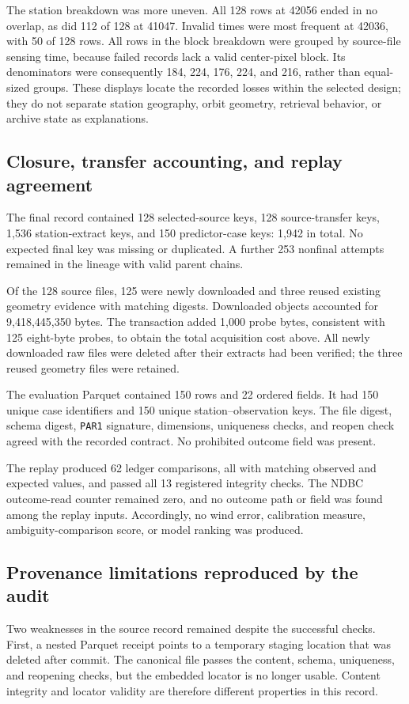 The station breakdown was more uneven. All 128 rows at 42056 ended in no overlap, as did 112 of 128 at 41047. Invalid times were most frequent at 42036, with 50 of 128 rows. All rows in the block breakdown were grouped by source-file sensing time, because failed records lack a valid center-pixel block. Its denominators were consequently 184, 224, 176, 224, and 216, rather than equal-sized groups. These displays locate the recorded losses within the selected design; they do not separate station geography, orbit geometry, retrieval behavior, or archive state as explanations.




\subsection{Closure, transfer accounting, and replay agreement}
The final record contained 128 selected-source keys, 128 source-transfer keys, 1,536 station-extract keys, and 150 predictor-case keys: 1,942 in total. No expected final key was missing or duplicated. A further 253 nonfinal attempts remained in the lineage with valid parent chains.

Of the 128 source files, 125 were newly downloaded and three reused existing geometry evidence with matching digests. Downloaded objects accounted for 9,418,445,350 bytes. The transaction added 1,000 probe bytes, consistent with 125 eight-byte probes, to obtain the total acquisition cost above. All newly downloaded raw files were deleted after their extracts had been verified; the three reused geometry files were retained.

The evaluation Parquet contained 150 rows and 22 ordered fields. It had 150 unique case identifiers and 150 unique station--observation keys. The file digest, schema digest, \texttt{PAR1} signature, dimensions, uniqueness checks, and reopen check agreed with the recorded contract. No prohibited outcome field was present.

The replay produced 62 ledger comparisons, all with matching observed and expected values, and passed all 13 registered integrity checks. The NDBC outcome-read counter remained zero, and no outcome path or field was found among the replay inputs. Accordingly, no wind error, calibration measure, ambiguity-comparison score, or model ranking was produced.

\subsection{Provenance limitations reproduced by the audit}
\label{sec:provenance}
Two weaknesses in the source record remained despite the successful checks. First, a nested Parquet receipt points to a temporary staging location that was deleted after commit. The canonical file passes the content, schema, uniqueness, and reopening checks, but the embedded locator is no longer usable. Content integrity and locator validity are therefore different properties in this record.

